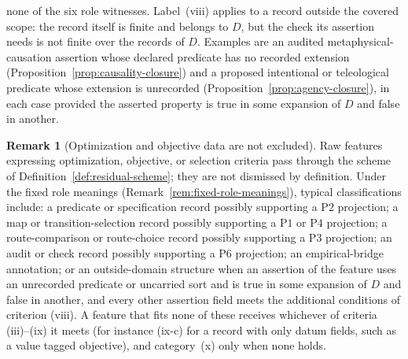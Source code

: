 \documentclass[11pt]{article}
\theoremstyle{definition}
\newtheorem{remark}[theorem]{Remark}
\newcommand{\Pone}{\ensuremath{\mathrm{P1}}}
\newcommand{\Ptwo}{\ensuremath{\mathrm{P2}}}
\newcommand{\Pthree}{\ensuremath{\mathrm{P3}}}
\newcommand{\Pfour}{\ensuremath{\mathrm{P4}}}
\newcommand{\Psix}{\ensuremath{\mathrm{P6}}}
\begin{document}
none of the six role witnesses. Label~(viii) applies to a record outside the
covered scope: the record itself is finite and belongs to \(D\), but the check
its assertion needs is not finite over the records of \(D\). Examples are an audited metaphysical-causation assertion whose declared
predicate has no recorded extension (Proposition~\ref{prop:causality-closure})
and a proposed intentional or teleological predicate whose extension is
unrecorded (Proposition~\ref{prop:agency-closure}), in each case
provided the asserted property is true in some expansion of \(D\)
and false in another.

\begin{remark}[Optimization and objective data are not excluded]\label{rem:optimization-not-excluded}
Raw features expressing optimization, objective, or selection criteria
pass through the scheme of Definition~\ref{def:residual-scheme}; they
are not dismissed by definition. Under the fixed role meanings
(Remark~\ref{rem:fixed-role-meanings}), typical classifications
include: a predicate or specification record possibly supporting a
\Ptwo{} projection; a map or transition-selection record possibly
supporting a \Pone{} or \Pfour{} projection; a route-comparison or
route-choice record possibly supporting a \Pthree{} projection; an
audit or check record possibly supporting a \Psix{} projection; an
empirical-bridge annotation; or an outside-domain structure when an assertion of the
feature uses an unrecorded predicate or uncarried sort and is true in some expansion of \(D\) and false in another, and every other assertion field meets the additional conditions of criterion (viii). A feature that
fits none of these receives whichever of criteria (iii)--(ix) it meets (for
instance (ix-c) for a record with only datum fields, such as a value tagged
objective), and category~(x) only when none holds.
\end{remark}
\end{document}
